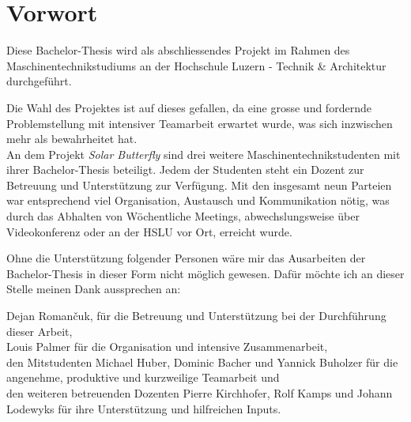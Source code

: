 \section*{Vorwort}
Diese Bachelor-Thesis wird als abschliessendes Projekt im Rahmen des Maschinentechnikstudiums an der Hochschule Luzern - Technik \& Architektur durchgeführt.

Die Wahl des Projektes ist auf dieses gefallen, da eine grosse und fordernde Problemstellung mit intensiver Teamarbeit erwartet wurde, was sich inzwischen mehr als bewahrheitet hat.\\
An dem Projekt \emph{Solar Butterfly} sind drei weitere Maschinentechnikstudenten mit ihrer Bachelor-Thesis beteiligt. Jedem der Studenten steht ein Dozent zur Betreuung und Unterstützung zur Verfügung. Mit den insgesamt neun Parteien war entsprechend viel Organisation, Austausch und Kommunikation nötig, was durch das Abhalten von  Wöchentliche Meetings, abwechslungsweise über Videokonferenz oder an der HSLU vor Ort, erreicht wurde.

Ohne die Unterstützung folgender Personen wäre mir das Ausarbeiten der Bachelor-Thesis in dieser Form nicht möglich gewesen. Dafür möchte ich an dieser Stelle meinen Dank aussprechen an:

Dejan Roman\v{c}uk, für die Betreuung und Unterstützung bei der Durchführung dieser Arbeit,\\
Louis Palmer für die Organisation und intensive Zusammenarbeit,\\
den Mitstudenten Michael Huber, Dominic Bacher und Yannick Buholzer für die angenehme, produktive und kurzweilige Teamarbeit und\\
den weiteren betreuenden Dozenten Pierre Kirchhofer, Rolf Kamps und Johann Lodewyks für ihre Unterstützung und hilfreichen Inputs.
\newpage
